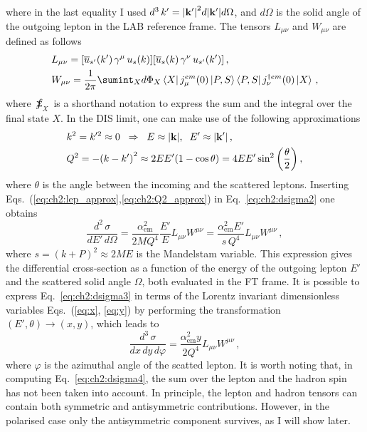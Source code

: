 where in the last equality I used $d^3 \, k' = \qty| \vb{k}' |^2 d|\vb{k}'| d\Omega$, and $d\Omega$ is the solid angle of the outgoing lepton in the LAB reference frame. The tensors $L_{\mu\nu}$ and $W_{\mu\nu}$ are defined as follows
\begin{align}
    &L_{\mu\nu} = \qty[ \overline{u}_{s'}(k') \, \gamma^{\mu}\, u_s(k)] \qty[\overline{u}_{s}(k) \,\gamma^{\nu}\, u_{s'}(k') ] \,,
    \label{eq:ch2:lep_tens} \\
    &W_{\mu\nu} = \frac{1}{2\pi} \sumint_{X}  d\Phi_X  \bra{X} j_{\mu}^{em} (0) \ket{P,S}  \bra{P,S} j_{\nu}^{\dag em} (0) \ket{X}  \,,
    \label{eq:ch2:had_tens}
\end{align}
where $\sumint_{X}$ is a shorthand notation to express the sum and the integral over the final state $X$. In the DIS limit, one can make use of the following approximations
\begin{align}
    &k^2 = k'^2 \approx 0 \hspace{2mm} \Rightarrow \hspace{2mm} E \approx \qty| \vb{k} |, \hspace{2mm} E' \approx \qty| \vb{k'}|  \,,
    \label{eq:ch2:lep_approx}\\
    &Q^2 = - \qty(k - k')^2 \approx  2EE' \qty(1 - \cos \theta) = 4EE' \sin^2 \qty(\frac{\theta}{2}) \,,
    \label{eq:ch2:Q2_approx}
\end{align}
where $\theta$ is the angle between the incoming and the scattered leptons. Inserting Eqs.~(\ref{eq:ch2:lep_approx},\ref{eq:ch2:Q2_approx}) in Eq.~\eqref{eq:ch2:dsigma2} one obtains 
\begin{equation}
    \frac{d^2\,\sigma}{dE' \, d\Omega} = \frac{\alpha_{\textrm{em}}^2}{2MQ^4} \frac{E'}{E} L_{\mu\nu}W^{\mu\nu} = \frac{\alpha_{\textrm{em}}^2 E'}{s\, Q^4} L_{\mu\nu}W^{\mu\nu}\,,
    \label{eq:ch2:dsigma3}
\end{equation}
where $s = (k + P)^2 \approx 2 M E$ is the Mandelstam variable. This expression gives the differential cross-section as a function of the energy of the outgoing lepton $E'$ and the scattered solid angle $\Omega$, both evaluated in the FT frame. It is possible to express Eq.~\eqref{eq:ch2:dsigma3} in terms of the Lorentz invariant dimensionless variables Eqs.~(\ref{eq:x}, \ref{eq:y}) by performing the transformation $(E', \theta) \rightarrow (x,y)$, which leads to
\begin{equation}
    \frac{d^3 \, \sigma}{dx \, dy \, d\varphi} = \frac{\alpha_{\textrm{em}}^2 y}{2 Q^4} L_{\mu\nu} W^{\mu\nu} \,,
    \label{eq:ch2:dsigma4}
\end{equation}
where $\varphi$ is the azimuthal angle of the scatted lepton. It is worth noting that, in computing Eq.~\eqref{eq:ch2:dsigma4}, the sum over the lepton and the hadron spin has not been taken into account. In principle, the lepton and hadron tensors can contain both symmetric and antisymmetric contributions. However, in the polarised case only the antisymmetric component survives, as I will show later.

